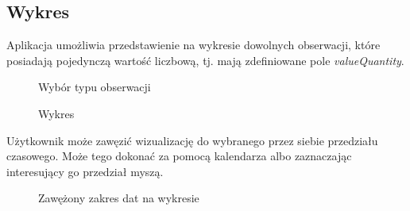 \documentclass[a4paper]{article}
\begin{document}
\subsection{Wykres}
Aplikacja umożliwia przedstawienie na wykresie dowolnych obserwacji, które posiadają pojedynczą wartość liczbową,
tj. mają zdefiniowane pole \textit{valueQuantity}.
\begin{figure}[H]
    \caption{Wybór typu obserwacji}
\end{figure}
\begin{figure}[H]
    \caption{Wykres}
\end{figure}

Użytkownik może zawęzić wizualizację do wybranego przez siebie przedziału czasowego. Może tego dokonać za pomocą kalendarza 
albo zaznaczając interesujący go przedział myszą.
\begin{figure}[H]
    \caption{Zawężony zakres dat na wykresie}
\end{figure}
\end{document}
